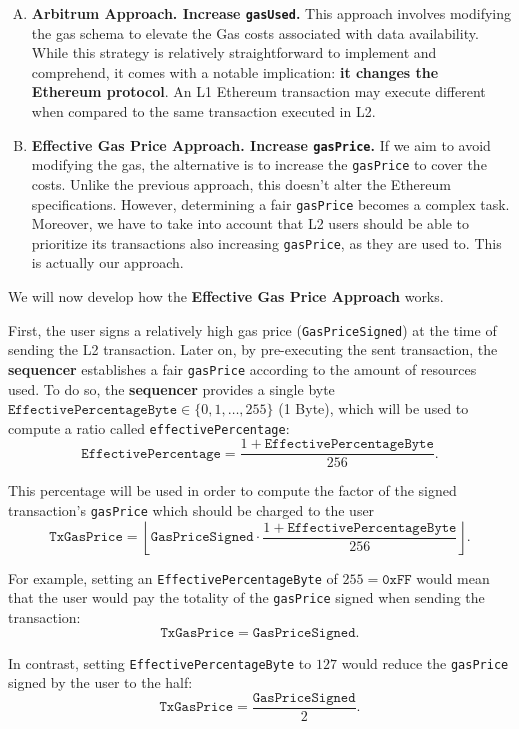 \begin{enumerate}[(A)]
\item \textbf{Arbitrum Approach. Increase \texttt{gasUsed}. }
This approach involves modifying the gas schema to elevate the Gas costs associated with data availability. While this strategy is relatively straightforward to implement and comprehend, it comes with a notable implication: \textbf{it changes the Ethereum protocol}. An L1 Ethereum transaction may execute different when compared to the same transaction executed in L2.
	
\item \textbf{Effective Gas Price Approach. Increase \texttt{gasPrice}. }
If we aim to avoid modifying the gas, the alternative is to increase the \texttt{gasPrice} to cover the costs. Unlike the previous approach, this doesn't alter the Ethereum specifications. However, determining a fair \texttt{gasPrice} becomes a complex task.  Moreover, we have to take into account that L2 users should be able to prioritize its transactions also increasing \texttt{gasPrice}, as they are used to. This is actually our approach.
\end{enumerate}


We will now develop how the \textbf{Effective Gas Price Approach} works. 

First, the user signs a relatively high gas price (\texttt{GasPriceSigned}) at the time of sending the L2 transaction. Later on, by pre-executing the sent transaction, the \textbf{sequencer} establishes a fair \texttt{gasPrice} according to the amount of resources used. To do so, the \textbf{sequencer} provides a single byte $\texttt{EffectivePercentageByte} \in \{0, 1, \dots, 255 \}$ (1 Byte), which will be used to compute a ratio called \texttt{effectivePercentage}:
\[
\texttt{EffectivePercentage} = \frac{1 + \texttt{EffectivePercentageByte}}{256}.
\]

This percentage will be used in order to compute the factor of the signed transaction's \texttt{gasPrice} which should be charged to the user %
\[
\texttt{TxGasPrice} = \left\lfloor \texttt{GasPriceSigned} \cdot \frac{1 + \texttt{EffectivePercentageByte}}{256} \right\rfloor.
\]

For example, setting an \texttt{EffectivePercentageByte} of $255 = \texttt{0xFF}$ would mean that the user would pay the totality of the \texttt{gasPrice} signed when sending the transaction:
\[
\texttt{TxGasPrice} = \texttt{GasPriceSigned}.
\]

In contrast, setting \texttt{EffectivePercentageByte} to $127$ would reduce the \texttt{gasPrice} signed by the user to the half:
\[
\texttt{TxGasPrice} = \frac{\texttt{GasPriceSigned}}{2}.
\]

